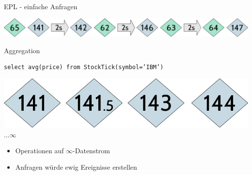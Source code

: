 \documentclass[usenames,dvipsnames]{beamer}
\begin{document}
\begin{frame}{EPL - einfache Anfragen}
\begin{center}
    \includegraphics[scale=0.35]{img/stream-1}
\end{center}
\begin{exampleblock}{\centering Aggregation}
    \begin{center}
        \texttt{select avg(price) from StockTick(symbol='IBM')}
    \end{center}
\end{exampleblock}
\begin{center}
    \includegraphics[scale=0.2]{img/solution-2}$\dots \infty$
\end{center}

\pause
\begin{alertblock}{}
    \begin{itemize}
        \item Operationen auf $\infty$-Datenstrom
        \item Anfragen würde ewig Ereignisse erstellen
    \end{itemize}
\end{alertblock}

\end{frame}
\end{document}
